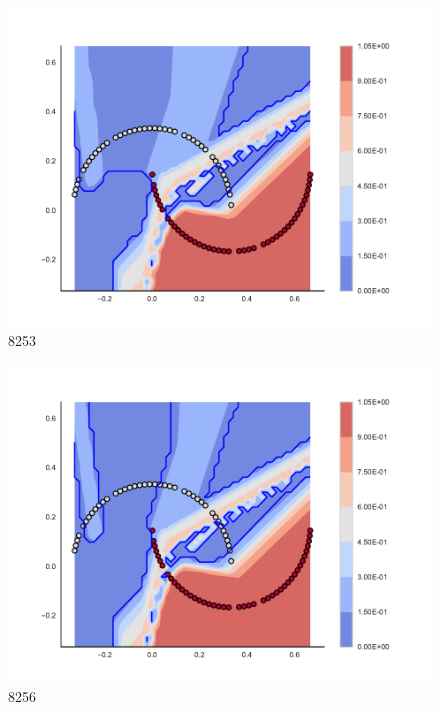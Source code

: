 \begin{subfigure}[b]{0.09\textwidth}
    \includegraphics[clip, trim=2.35cm 1.75cm 4.5cm 0cm,width=\textwidth]{img/convergence/8253.pdf}
    \caption{8253}
    \label{fig:convergence_8253}
\end{subfigure}
%
\begin{subfigure}[b]{0.09\textwidth}
    \includegraphics[clip, trim=2.35cm 1.75cm 4.5cm 0cm,width=\textwidth]{img/convergence/8256.pdf}
    \caption{8256}
    \label{fig:convergence_8256}
\end{subfigure}
%
